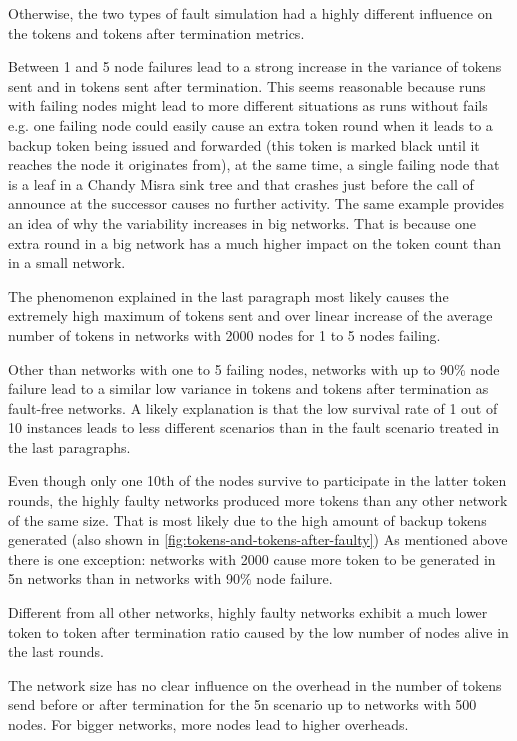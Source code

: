 Otherwise, the two types of fault simulation had a highly different influence on the tokens and tokens after termination metrics.

Between 1 and 5 node failures lead to a strong increase in the variance of tokens sent and in tokens sent after termination.
This seems reasonable because runs with failing nodes might lead to more different situations as runs without fails e.g. one failing node could easily cause an extra token round when it leads to a backup token being issued and forwarded (this token is marked black until it reaches the node it originates from), at the same time, a single failing node that is a leaf in a Chandy Misra sink tree and that crashes just before the call of announce at the successor  causes no further activity.
The same example provides an idea of why the variability increases in big networks. 
That is because one extra round in a big network has a much higher impact on the token count than in a small network.

The phenomenon explained in the last paragraph most likely causes the extremely high maximum of tokens sent and over linear increase of the average number of tokens in networks with 2000 nodes for 1 to 5 nodes failing.

Other than networks with one to 5 failing nodes, networks with up to 90\% node failure lead to a similar low variance in tokens and tokens after termination as fault-free networks.
A likely explanation is that the low survival rate of 1 out of 10 instances leads to less different scenarios than in the fault scenario treated in the last paragraphs.

Even though only one 10th of the nodes survive to participate in the latter token rounds, the highly faulty networks produced more tokens than any other network of the same size.
That is most likely due to the high amount of backup tokens generated (also shown in \cref{fig:tokens-and-tokens-after-faulty})
As mentioned above there is one exception: networks with 2000 cause more token to be generated in 5n networks than in networks with 90\% node failure.

Different from all other networks, highly faulty networks exhibit a much lower token to token after termination ratio caused by the low number of nodes alive in the last rounds.

The network size has no clear influence on the overhead in the number of tokens send before or after termination for the 5n scenario up to networks with 500 nodes. 
For bigger networks, more nodes lead to higher overheads.

